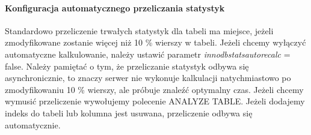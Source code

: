 \paragraph{Konfiguracja automatycznego przeliczania statystyk}
Standardowo przeliczenie trwałych statystyk dla tabeli ma miejsce, jeżeli zmodyfikowane zostanie więcej niż 10 \% wierszy w tabeli. Jeżeli chcemy wyłączyć automatyczne kalkulowanie, należy ustawić parametr \textit{innodb\textunderscore stats\textunderscore auto\textunderscore recalc} = false. Należy pamiętać o tym, że przeliczanie statystyk odbywa się asynchronicznie, to znaczy serwer nie wykonuje kalkulacji natychmiastowo po zmodyfikowaniu 10 \% wierszy, ale próbuje znaleźć optymalny czas. Jeżeli chcemy wymusić przeliczenie wywołujemy polecenie ANALYZE TABLE. Jeżeli dodajemy indeks do tabeli lub kolumna jest usuwana, przeliczenie odbywa się automatycznie.

